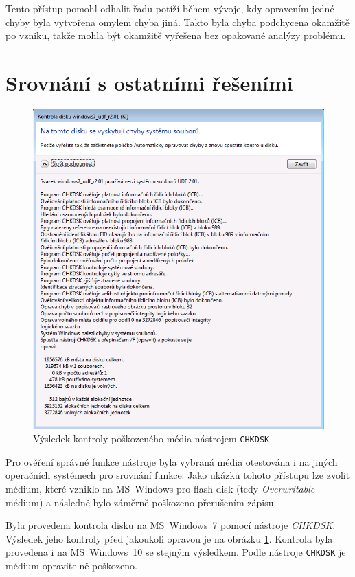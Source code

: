 Tento přístup pomohl odhalit řadu potíží během vývoje, kdy opravením jedné chyby byla vytvořena omylem chyba jiná. Takto byla chyba podchycena okamžitě po vzniku, takže mohla být okamžitě vyřešena bez opakované analýzy problému. 

\section{Srovnání s ostatními řešeními}
\label{sec:srovnani}
\begin{figure}[] 
    \centering
    \includegraphics[scale=0.38]{obrazky/chkdsk.png}
    \caption{Výsledek kontroly poškozeného média nástrojem \texttt{CHKDSK}}
    \label{fig:chkdsk}
\end{figure}
Pro ověření správné funkce nástroje byla vybraná média otestována i na jiných operačních systémech pro srovnání funkce. Jako ukázku tohoto přístupu lze zvolit médium, které vzniklo na MS~Windows pro flash disk (tedy \textit{Overwritable} médium) a následně bylo záměrně poškozeno přerušením zápisu.

Byla provedena kontrola disku na MS~Windows~7 pomocí nástroje \textit{CHKDSK}. Výsledek jeho kontroly před jakoukoli opravou je na obrázku \ref{fig:chkdsk}. Kontrola byla provedena i na MS~Windows~10 se stejným výsledkem. Podle nástroje \texttt{CHKDSK} je médium opravitelně poškozeno.

